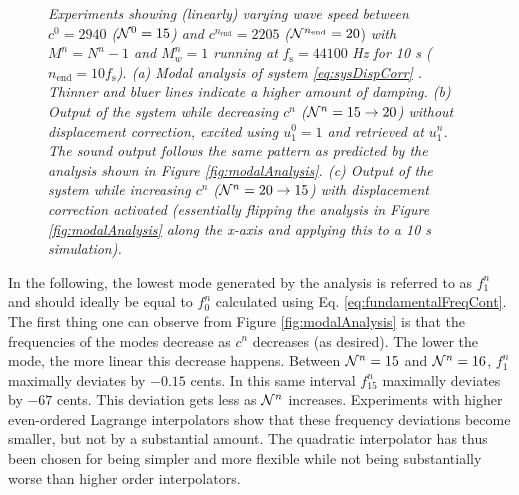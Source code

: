 \begin{figure}[h!]
    \vspace{-1em}\caption{{\it Experiments showing (linearly) varying wave speed between $c^0 = 2940$ ($\mathcal{N}^0 = 15$) and} $c^{n_\text{end}} = 2205$ {\it (}$\mathcal{N}^{n_\text{end}} = 20$) {\it with $M^n = N^n - 1$ and $M_w^n = 1$ running at }$f_\text{s} = 44100$ {\it Hz for 10 s (}$n_\text{end} = 10f_\text{s}${\it ). (a) Modal analysis of system \eqref{eq:sysDispCorr}%
    . Thinner and bluer lines indicate a higher amount of damping. (b) Output of the system while decreasing $c^n$ ($\mathcal{N}^n = 15 \rightarrow 20$) without displacement correction, excited using $u_1^0=1$ and retrieved at $u_1^n$. The sound output follows the same pattern as predicted by the analysis shown in Figure \ref{fig:modalAnalysis}. (c) Output of the system while increasing $c^n$ ($\mathcal{N}^n = 20 \rightarrow 15$) with displacement correction activated (essentially flipping the analysis in Figure \ref{fig:modalAnalysis} along the x-axis and applying this to a 10 s simulation).}\label{fig:analysisAndSpecs}}
\end{figure}
In the following, %
the lowest mode generated by the analysis is referred to as $f_1^n$ and should ideally be equal to $f_0^n$ calculated using Eq. \eqref{eq:fundamentalFreqCont}. %
%
The first thing one can observe from Figure \ref{fig:modalAnalysis} is that the frequencies of the modes decrease as $c^n$ decreases (as desired). The lower the mode, the more linear this decrease happens. Between $\mathcal{N}^n = 15$ and $\mathcal{N}^n = 16$, $f_1^n$ maximally deviates by $-0.15$ cents. In this same interval $f_{15}^n$ maximally deviates by $-67$ cents. This deviation %
gets %
less as $\mathcal{N}^n$ increases. %
%
Experiments with higher even-ordered Lagrange interpolators show that these frequency deviations become smaller, but not by a substantial amount. The quadratic interpolator has thus been chosen for being simpler and more flexible while not being substantially worse than higher order interpolators.

